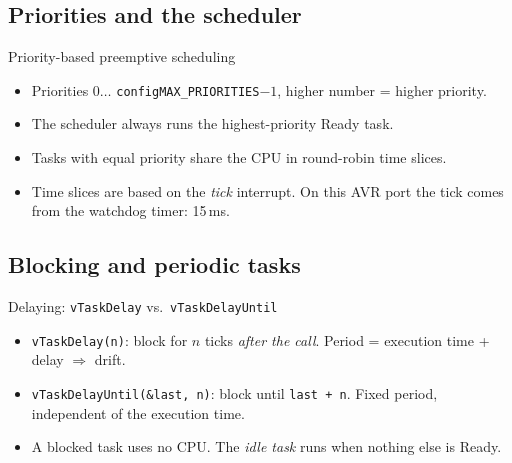 \subsection{Priorities and the scheduler}
\begin{frame}{Priority-based preemptive scheduling}
  \begin{itemize}
    \item Priorities $0 \dots$ \texttt{configMAX\_PRIORITIES}$-1$, higher number = higher priority.
    \item The scheduler always runs the highest-priority Ready task.
    \item Tasks with equal priority share the CPU in round-robin time slices.
    \item Time slices are based on the \emph{tick} interrupt. On this AVR port the tick comes from the watchdog timer: 15\,ms.
  \end{itemize}
\end{frame}


\subsection{Blocking and periodic tasks}
\begin{frame}{Delaying: \texttt{vTaskDelay} vs.\ \texttt{vTaskDelayUntil}}
  \begin{itemize}
    \item \texttt{vTaskDelay(n)}: block for $n$ ticks \emph{after the call}. Period = execution time + delay $\Rightarrow$ drift.
    \item \texttt{vTaskDelayUntil(\&last, n)}: block until \texttt{last + n}. Fixed period, independent of the execution time.
    \item A blocked task uses no CPU. The \emph{idle task} runs when nothing else is Ready.
  \end{itemize}
\end{frame}

